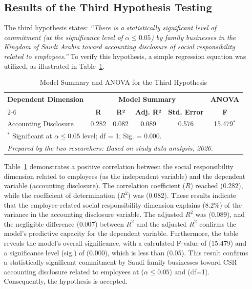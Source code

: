 \documentclass[10pt]{NSP1}
\begin{document}
	\subsection{Results of the Third Hypothesis Testing}
	
	The third hypothesis states: \emph{``There is a statistically significant level of commitment (at the significance level of \(\alpha \leq 0.05\)) by family businesses in the Kingdom of Saudi Arabia toward accounting disclosure of social responsibility related to employees.''} To verify this hypothesis, a simple regression equation was utilized, as illustrated in Table~\ref{tab:h3}.
	
	\begin{table}[H]
		\centering
		\caption{Model Summary and ANOVA for the Third Hypothesis}
		\label{tab:h3}
		\vspace{5pt}
		\small
		\begin{tabular}{lccccc}
			\hline
			\multirow{2}{*}{\textbf{Dependent Dimension}} & \multicolumn{4}{c}{\textbf{Model Summary}} & \multicolumn{1}{c}{\textbf{ANOVA}} \\
			\cline{2-6}
			& \textbf{R} & \textbf{R²} & \textbf{Adj. R²} & \textbf{Std. Error} & \textbf{F} \\
			\hline
			Accounting Disclosure & 0.282 & 0.082 & 0.089 & 0.576 & 15.479\(^{*}\) \\
			\hline
			\multicolumn{6}{l}{\footnotesize \(^{*}\) Significant at \(\alpha \leq 0.05\) level; df = 1; Sig. = 0.000.} \\
			\multicolumn{6}{l}{\footnotesize \textit{Prepared by the two researchers: Based on study data analysis, 2026.}} \\
		\end{tabular}
	\end{table}
	
	Table~\ref{tab:h3} demonstrates a positive correlation between the social responsibility dimension related to employees (as the independent variable) and the dependent variable (accounting disclosure). The correlation coefficient (\(R\)) reached (0.282), while the coefficient of determination (\(R^2\)) was (0.082). These results indicate that the employee-related social responsibility dimension explains (8.2\%) of the variance in the accounting disclosure variable. The adjusted \(R^2\) was (0.089), and the negligible difference (0.007) between \(R^2\) and the adjusted \(R^2\) confirms the model's predictive capacity for the dependent variable. Furthermore, the table reveals the model's overall significance, with a calculated F-value of (15.479) and a significance level (sig.) of (0.000), which is less than (0.05). This result confirms a statistically significant commitment by Saudi family businesses toward CSR accounting disclosure related to employees at (\(\alpha \leq 0.05\)) and (df=1). Consequently, the hypothesis is accepted.
	
\end{document}
